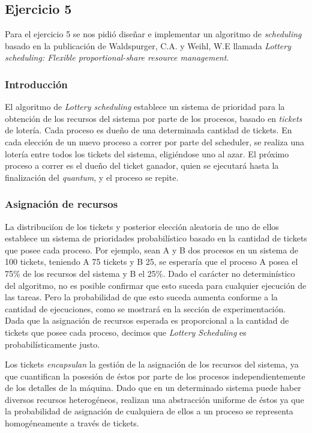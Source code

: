 \subsection{Ejercicio 5}

Para el ejercicio 5 se nos pidi\'o dise\~nar e implementar un algoritmo de \textit{scheduling} basado en la publicaci\'on de Waldspurger, C.A. y Weihl, W.E llamada \textit{Lottery scheduling: Flexible proportional-share resource management}.

\subsubsection{Introducci\'on}

El algoritmo de \textit{Lottery scheduling} establece un sistema de prioridad para la obtenci\'on de los recursos del sistema por parte de los procesos, basado en \textit{tickets} de loter\'ia. Cada proceso es due\~no de una determinada cantidad de tickets. En cada elecci\'on de un nuevo proceso a correr por parte del scheduler, se realiza una loter\'ia entre todos los tickets del sistema, eligi\'endose uno al azar. El pr\'oximo proceso a correr es el due\~no del ticket ganador, quien se ejecutar\'a hasta la finalizaci\'on del \textit{quantum}, y el proceso se repite.

\subsubsection{Asignación de recursos}

La distribuci\'ion de los tickets y posterior elecci\'on aleatoria de uno de ellos establece un sistema de prioridades probabil\'istico basado en la cantidad de tickets que posee cada proceso. Por ejemplo, sean A y B dos procesos en un sistema de 100 tickets, teniendo A 75 tickets y B 25, se esperar\'ia que el proceso A posea el 75\% de los recursos del sistema y B el 25\%. Dado el car\'acter no determin\'istico del algoritmo, no es posible confirmar que esto suceda para cualquier ejecuci\'on de las tareas. Pero la probabilidad de que esto suceda aumenta conforme a la cantidad de ejecuciones, como se mostrar\'a en la secci\'on de experimentaci\'on. Dada que la asignaci\'on de recursos esperada es proporcional a la cantidad de tickets que posee cada proceso, decimos que \textit{Lottery Scheduling} es probabil\'isticamente justo.

Los tickets \textit{encapsulan} la gesti\'on de la asignaci\'on de los recursos del sistema, ya que cuantifican la posesi\'on de \'estos por parte de los procesos independientemente de los detalles de la m\'aquina. Dado que en un determinado sistema puede haber diversos recursos heterog\'eneos, realizan una abstracci\'on uniforme de \'estos ya que la probabilidad de asignaci\'on de cualquiera de ellos a un proceso se representa homog\'eneamente a trav\'es de tickets. 


